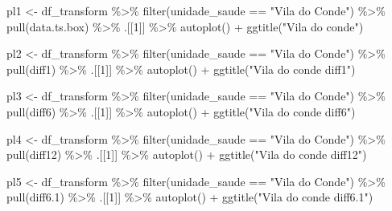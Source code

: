 \documentclass[
  number]{elsarticle}
\newenvironment{Shaded}{\begin{snugshade}}{\end{snugshade}}
\newcommand{\DecValTok}[1]{\textcolor[rgb]{0.68,0.00,0.00}{#1}}
\newcommand{\FloatTok}[1]{\textcolor[rgb]{0.68,0.00,0.00}{#1}}
\newcommand{\FunctionTok}[1]{\textcolor[rgb]{0.28,0.35,0.67}{#1}}
\newcommand{\NormalTok}[1]{\textcolor[rgb]{0.00,0.23,0.31}{#1}}
\newcommand{\OtherTok}[1]{\textcolor[rgb]{0.00,0.23,0.31}{#1}}
\newcommand{\SpecialCharTok}[1]{\textcolor[rgb]{0.37,0.37,0.37}{#1}}
\newcommand{\StringTok}[1]{\textcolor[rgb]{0.13,0.47,0.30}{#1}}
\begin{document}
\begin{Shaded}
\begin{Highlighting}[]
\NormalTok{pl1 }\OtherTok{\textless{}{-}}\NormalTok{ df\_transform  }\SpecialCharTok{\%\textgreater{}\%} 
    \FunctionTok{filter}\NormalTok{(unidade\_saude }\SpecialCharTok{==} \StringTok{"Vila do Conde"}\NormalTok{) }\SpecialCharTok{\%\textgreater{}\%}
    \FunctionTok{pull}\NormalTok{(data.ts.box) }\SpecialCharTok{\%\textgreater{}\%} 
\NormalTok{    .[[}\DecValTok{1}\NormalTok{]] }\SpecialCharTok{\%\textgreater{}\%} 
    \FunctionTok{autoplot}\NormalTok{() }\SpecialCharTok{+} 
    \FunctionTok{ggtitle}\NormalTok{(}\StringTok{"Vila do conde"}\NormalTok{)}


\NormalTok{pl2 }\OtherTok{\textless{}{-}}\NormalTok{ df\_transform  }\SpecialCharTok{\%\textgreater{}\%} 
    \FunctionTok{filter}\NormalTok{(unidade\_saude }\SpecialCharTok{==} \StringTok{"Vila do Conde"}\NormalTok{) }\SpecialCharTok{\%\textgreater{}\%}
    \FunctionTok{pull}\NormalTok{(diff1) }\SpecialCharTok{\%\textgreater{}\%} 
\NormalTok{    .[[}\DecValTok{1}\NormalTok{]] }\SpecialCharTok{\%\textgreater{}\%} 
    \FunctionTok{autoplot}\NormalTok{() }\SpecialCharTok{+} 
    \FunctionTok{ggtitle}\NormalTok{(}\StringTok{"Vila do conde diff1"}\NormalTok{)}

\NormalTok{pl3 }\OtherTok{\textless{}{-}}\NormalTok{ df\_transform  }\SpecialCharTok{\%\textgreater{}\%} 
    \FunctionTok{filter}\NormalTok{(unidade\_saude }\SpecialCharTok{==} \StringTok{"Vila do Conde"}\NormalTok{) }\SpecialCharTok{\%\textgreater{}\%}
    \FunctionTok{pull}\NormalTok{(diff6) }\SpecialCharTok{\%\textgreater{}\%} 
\NormalTok{    .[[}\DecValTok{1}\NormalTok{]] }\SpecialCharTok{\%\textgreater{}\%} 
    \FunctionTok{autoplot}\NormalTok{() }\SpecialCharTok{+} 
    \FunctionTok{ggtitle}\NormalTok{(}\StringTok{"Vila do conde diff6"}\NormalTok{)}

\NormalTok{pl4 }\OtherTok{\textless{}{-}}\NormalTok{ df\_transform  }\SpecialCharTok{\%\textgreater{}\%} 
    \FunctionTok{filter}\NormalTok{(unidade\_saude }\SpecialCharTok{==} \StringTok{"Vila do Conde"}\NormalTok{) }\SpecialCharTok{\%\textgreater{}\%}
    \FunctionTok{pull}\NormalTok{(diff12) }\SpecialCharTok{\%\textgreater{}\%} 
\NormalTok{    .[[}\DecValTok{1}\NormalTok{]] }\SpecialCharTok{\%\textgreater{}\%} 
    \FunctionTok{autoplot}\NormalTok{() }\SpecialCharTok{+} 
    \FunctionTok{ggtitle}\NormalTok{(}\StringTok{"Vila do conde diff12"}\NormalTok{)}

\NormalTok{pl5 }\OtherTok{\textless{}{-}}\NormalTok{ df\_transform  }\SpecialCharTok{\%\textgreater{}\%} 
    \FunctionTok{filter}\NormalTok{(unidade\_saude }\SpecialCharTok{==} \StringTok{"Vila do Conde"}\NormalTok{) }\SpecialCharTok{\%\textgreater{}\%}
    \FunctionTok{pull}\NormalTok{(diff6}\FloatTok{.1}\NormalTok{) }\SpecialCharTok{\%\textgreater{}\%} 
\NormalTok{    .[[}\DecValTok{1}\NormalTok{]] }\SpecialCharTok{\%\textgreater{}\%} 
    \FunctionTok{autoplot}\NormalTok{() }\SpecialCharTok{+} 
    \FunctionTok{ggtitle}\NormalTok{(}\StringTok{"Vila do conde diff6.1"}\NormalTok{)}


\end{Highlighting}
\end{Shaded}
\end{document}
